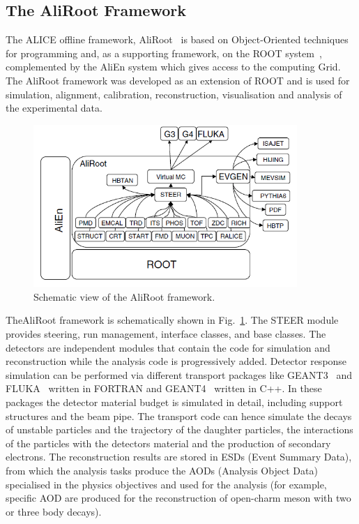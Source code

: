 \subsection{The AliRoot Framework}
The ALICE offline framework, AliRoot~\cite{Aamodt:2008zz} is based on Object-Oriented techniques
 for programming and, as a supporting framework, on the ROOT system~\cite{Brun:1997pa}, 
 complemented by the AliEn system which gives access to the computing Grid. The 
 AliRoot framework was developed as an extension of ROOT and is used for simulation, 
 alignment, calibration, reconstruction, visualisation and analysis of the experimental data.
\begin{figure}[h]
\centering
\includegraphics[width=10cm]{FigCap3/aliroot.png}
\caption{Schematic view of the AliRoot framework.}
\label{fig:aliroot}
\end{figure}
TheAliRoot framework is schematically shown in Fig.~\ref{fig:aliroot}. The STEER module 
provides steering, run management, interface classes, and base classes. The detectors are 
independent modules that contain the code for simulation and reconstruction while the 
analysis code is progressively added. Detector response simulation can be performed 
via different transport  packages like GEANT3~\cite{Brun:1082634} and FLUKA~\cite{Ferrari:898301} 
written in FORTRAN and GEANT4~\cite{Agostinelli:2002hh} written in C++. In these packages 
the detector material budget is simulated in detail, including support structures and 
the beam pipe. The transport code can hence simulate the decays of unstable 
particles and the trajectory of the daughter particles, the interactions of the 
particles with the detectors material and the production of secondary electrons.
The reconstruction results are stored in ESDs (Event Summary Data), from which 
the analysis tasks produce the AODs (Analysis Object Data) specialised in the physics 
objectives and used for the analysis (for example, specific AOD are produced for the 
reconstruction of open-charm meson with two or three body decays).

